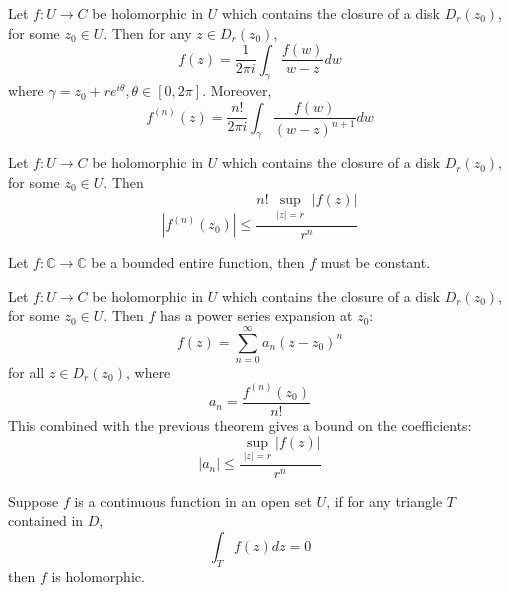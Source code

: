 \documentclass[openany]{book}
\newcommand{\C}{\mathbb{C}}
\begin{document}
\begin{prop}
    Let $f:U\to C$ be holomorphic in $U$ which contains the closure of a disk $D_r(z_0)$, for some $z_0\in U$. Then for any $z\in D_r(z_0)$, 
    \begin{equation*}
        f(z)=\frac{1}{2\pi i}\int_\gamma \frac{f(w)}{w-z}dw
    \end{equation*}
    where $\gamma=z_0+re^{i\theta}, \theta\in[0,2\pi]$. Moreover, 
    \begin{equation*}
        f^{(n)}(z)=\frac{n!}{2\pi i}\int_\gamma\frac{f(w)}{(w-z)^{n+1}}dw
    \end{equation*}
\end{prop}

\begin{prop}
    Let $f:U\to C$ be holomorphic in $U$ which contains the closure of a disk $D_r(z_0)$, for some $z_0\in U$. Then 
    \begin{equation*}
        |f^{(n)}(z_0)|\leq\frac{n!\sup_{\substack{|z|=r}}|f(z)|}{r^n}
    \end{equation*}
\end{prop}



\begin{prop}
    Let $f:\C\to\C$ be a bounded entire function, then $f$ must be constant.
\end{prop}


\begin{prop}
    Let $f:U\to C$ be holomorphic in $U$ which contains the closure of a disk $D_r(z_0)$, for some $z_0\in U$. Then $f$ has a power series expansion at $z_0$:
    \begin{equation*}
        f(z)=\sum_{n=0}^\infty a_n(z-z_0)^n
    \end{equation*}
    for all $z\in D_r(z_0)$, where 
    \begin{equation*}
        a_n=\frac{f^{(n)}(z_0)}{n!}
    \end{equation*}
    This combined with the previous theorem gives a bound on the coefficients:
    \begin{equation*}
        |a_n|\leq\frac{\sup_{|z|=r}|f(z)|}{r^n}
    \end{equation*}
\end{prop}

\begin{prop}
    Suppose $f$ is a continuous function in an open set $U$, if for any triangle $T$ contained in $D$, 
    \begin{equation*}
        \int_T f(z)dz=0
    \end{equation*}
    then $f$ is holomorphic.
\end{prop}
\end{document}
